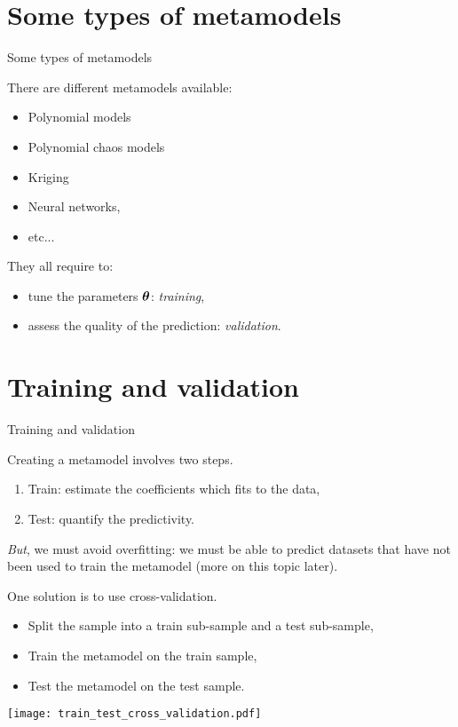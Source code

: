 \documentclass{beamer}
\begin{document}

\section{Some types of metamodels}
\begin{frame}[t]{Some types of metamodels}

There are different metamodels available:
\begin{itemize}
\item Polynomial models 
\item Polynomial chaos models 
\item Kriging
\item Neural networks, 
\item etc...
\end{itemize}

They all require to:
\begin{itemize}
\item tune the parameters $\boldsymbol{\theta}$: \emph{training}, 
\item assess the quality of the prediction: \emph{validation}.
\end{itemize}

\end{frame}


\section{Training and validation}
\begin{frame}[t]{Training and validation}

Creating a metamodel involves two steps.
\begin{enumerate}
\item Train: estimate the coefficients which fits to the data,
\item Test: quantify the predictivity.
\end{enumerate}

\emph{But}, we must avoid overfitting: we must be able 
to predict datasets that have not been used to train the metamodel 
(more on this topic later).

One solution is to use cross-validation.
\begin{itemize}
\item Split the sample into a train sub-sample and a test sub-sample,
\item Train the metamodel on the train sample,
\item Test the metamodel on the test sample.
\end{itemize}

\begin{center}
 \texttt{[image: train\_test\_cross\_validation.pdf]}
\end{center}

\end{frame}
\end{document}
